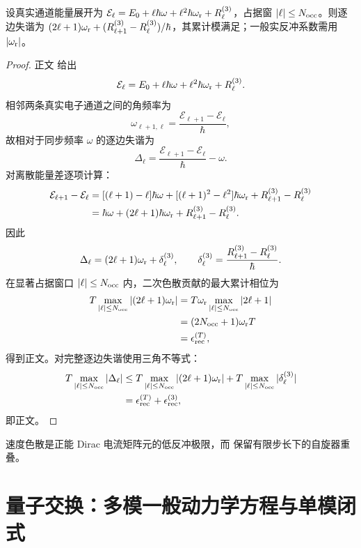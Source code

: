\begin{proposition}[格点色散差的反冲相位界]
设真实通道能量展开为 $\mathcal E_\ell=E_0+\ell\hbar\omega+\ell^2\hbar\omega_{\rm r}+R_\ell^{(3)}$，占据窗 $|\ell|\le N_{\rm occ}$。则逐边失谐为 $(2\ell+1)\omega_{\rm r}+(R_{\ell+1}^{(3)}-R_\ell^{(3)})/\hbar$，其累计模满足；一般实反冲系数需用 $|\omega_{\rm r}|$。
\end{proposition}
\begin{proof}
正文 给出
\[
\mathcal E_\ell
=E_0+\ell\hbar\omega+\ell^2\hbar\omega_{\rm r}+R_\ell^{(3)}.
\]
相邻两条真实电子通道之间的角频率为
\[
\omega_{\ell+1,\ell}
=\frac{\mathcal E_{\ell+1}-\mathcal E_\ell}{\hbar},
\]
故相对于同步频率 $\omega$ 的逐边失谐为
\[
\Delta_\ell
=\frac{\mathcal E_{\ell+1}-\mathcal E_\ell}{\hbar}-\omega.
\]
对离散能量差逐项计算：
\begin{align*}
\mathcal E_{\ell+1}-\mathcal E_\ell
={}&[(\ell+1)-\ell]\hbar\omega
+[(\ell+1)^2-\ell^2]\hbar\omega_{\rm r}
+R_{\ell+1}^{(3)}-R_\ell^{(3)}\\
={}&\hbar\omega+(2\ell+1)\hbar\omega_{\rm r}
+R_{\ell+1}^{(3)}-R_\ell^{(3)}.
\end{align*}
因此
\[
\Delta_\ell
=(2\ell+1)\omega_{\rm r}+\delta_\ell^{(3)},
\qquad
\delta_\ell^{(3)}
=\frac{R_{\ell+1}^{(3)}-R_\ell^{(3)}}{\hbar}.
\]
在显著占据窗口 $|\ell|\le N_{\rm occ}$ 内，二次色散贡献的最大累计相位为
\begin{align*}
T\max_{|\ell|\le N_{\rm occ}}
|(2\ell+1)\omega_{\rm r}|
&=T\omega_{\rm r}
\max_{|\ell|\le N_{\rm occ}}|2\ell+1|\\
&=(2N_{\rm occ}+1)\omega_{\rm r}T\\
&=\epsilon_{\rm rec}^{(T)},
\end{align*}
得到正文。对完整逐边失谐使用三角不等式：
\begin{align*}
T\max_{|\ell|\le N_{\rm occ}}|\Delta_\ell|
&\le
T\max_{|\ell|\le N_{\rm occ}}|(2\ell+1)\omega_{\rm r}|
+T\max_{|\ell|\le N_{\rm occ}}|\delta_\ell^{(3)}|\\
&=\epsilon_{\rm rec}^{(T)}+\epsilon_{\rm rec}^{(3)},
\end{align*}
即正文。
\end{proof}


速度色散是正能 Dirac 电流矩阵元的低反冲极限，而 保留有限步长下的自旋器重叠。

\section{量子交换：多模一般动力学方程与单模闭式}

